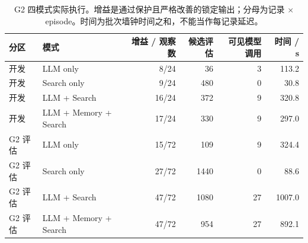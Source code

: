 \begin{table}[H]
\centering\small
\caption{G2 四模式实际执行。增益是通过保护且严格改善的锁定输出；分母为记录 $\times$ episode。时间为批次墙钟时间之和，不能当作每记录延迟。}
\begin{tabular}{llrrrr}
\toprule 分区 & 模式 & 增益 / 观察数 & 候选评估 & 可见模型调用 & 时间 / s \\ \midrule
开发 & LLM only & 8/24 & 36 & 3 & 113.2 \\
开发 & Search only & 9/24 & 480 & 0 & 30.8 \\
开发 & LLM + Search & 16/24 & 372 & 9 & 320.8 \\
开发 & LLM + Memory + Search & 17/24 & 330 & 9 & 297.0 \\
\midrule
G2 评估 & LLM only & 15/72 & 109 & 9 & 324.4 \\
G2 评估 & Search only & 27/72 & 1440 & 0 & 88.6 \\
G2 评估 & LLM + Search & 47/72 & 1080 & 27 & 1007.0 \\
G2 评估 & LLM + Memory + Search & 47/72 & 954 & 27 & 892.1 \\
\bottomrule\end{tabular}
\end{table}
